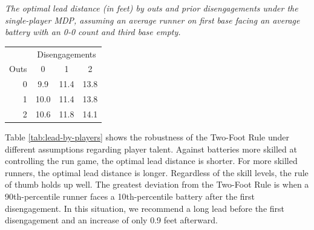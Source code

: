 \documentclass[opre,dblanonrev]{informs4}
\begin{document}
      \begin{table}
        \TABLE
        {\it The optimal lead distance (in feet) by outs and prior disengagements under the single-player MDP, assuming an average runner on first base facing an average battery with an 0-0 count and third base empty.        \label{tab:lead-by-outs-one-player}}
        {\begin{tabular}{r|ccc}
     & \multicolumn{3}{c}{Disengagements}\\
    Outs & 0 & 1 & 2 \\
      \hline
    0 & 9.9 & 11.4 & 13.8 \\ 
      1 & 10.0 & 11.4 & 13.8 \\ 
      2 & 10.6 & 11.8 & 14.1 \\ 
    \end{tabular}}
        {}
      \end{table}
  
      Table \ref{tab:lead-by-players} shows the robustness of the Two-Foot Rule under different assumptions regarding player talent. Against batteries more skilled at controlling the run game, the optimal lead distance is shorter. For more skilled runners, the optimal lead distance is longer. Regardless of the skill levels, the rule of thumb holds up well. The greatest deviation from the Two-Foot Rule is when a 90th-percentile runner faces a 10th-percentile battery after the first disengagement. In this situation, we recommend a long lead before the first disengagement and an increase of only 0.9 feet afterward.
    
\end{document}

